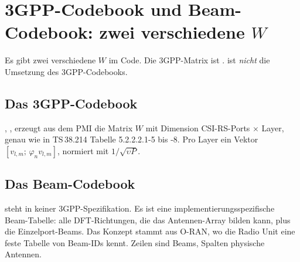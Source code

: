 \section{3GPP-Codebook und Beam-Codebook: zwei verschiedene $W$}
\label{sec:zwei-matrizen}

Es gibt zwei verschiedene \glqq$W$\grqq{} im Code. Die 3GPP-Matrix ist .
 ist \emph{nicht} die Umsetzung des 3GPP-Codebooks.

\subsection{Das 3GPP-Codebook}

, , erzeugt aus dem PMI
die Matrix $W$ mit Dimension CSI-RS-Ports $\times$ Layer, genau wie in TS\,38.214 Tabelle 5.2.2.2.1-5 bis -8.
Pro Layer ein Vektor $[v_{l,m};\,\varphi_n v_{l,m}]$, normiert mit $1/\sqrt{\upsilon P}$.

\subsection{Das Beam-Codebook}

 steht in keiner 3GPP-Spezifikation. Es ist eine
implementierungsspezifische Beam-Tabelle: alle DFT-Richtungen, die das Antennen-Array bilden kann, plus die
Einzelport-Beams. Das Konzept stammt aus O-RAN, wo die Radio Unit eine feste Tabelle von Beam-IDs kennt.
Zeilen sind Beams, Spalten physische Antennen.

